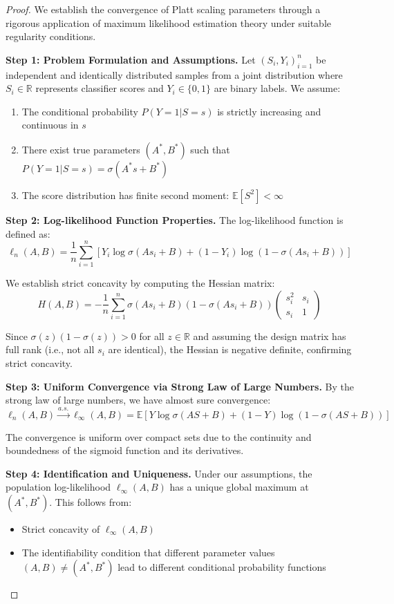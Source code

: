 \documentclass[12pt, a4paper]{article}
\begin{document}
\begin{proof}
We establish the convergence of Platt scaling parameters through a rigorous application of maximum likelihood estimation theory under suitable regularity conditions.

\textbf{Step 1: Problem Formulation and Assumptions.}
Let $(S_i, Y_i)_{i=1}^n$ be independent and identically distributed samples from a joint distribution where $S_i \in \mathbb{R}$ represents classifier scores and $Y_i \in \{0,1\}$ are binary labels. We assume:
\begin{enumerate}
    \item The conditional probability $P(Y=1|S=s)$ is strictly increasing and continuous in $s$
    \item There exist true parameters $(A^*, B^*)$ such that $P(Y=1|S=s) = \sigma(A^*s + B^*)$
    \item The score distribution has finite second moment: $\mathbb{E}[S^2] < \infty$
\end{enumerate}

\textbf{Step 2: Log-likelihood Function Properties.}
The log-likelihood function is defined as:
$$\ell_n(A,B) = \frac{1}{n}\sum_{i=1}^n \left[ Y_i \log \sigma(As_i + B) + (1-Y_i) \log(1 - \sigma(As_i + B)) \right]$$

We establish strict concavity by computing the Hessian matrix:
$$H(A,B) = -\frac{1}{n}\sum_{i=1}^n \sigma(As_i + B)(1-\sigma(As_i + B)) \begin{pmatrix} s_i^2 & s_i \\ s_i & 1 \end{pmatrix}$$

Since $\sigma(z)(1-\sigma(z)) > 0$ for all $z \in \mathbb{R}$ and assuming the design matrix has full rank (i.e., not all $s_i$ are identical), the Hessian is negative definite, confirming strict concavity.

\textbf{Step 3: Uniform Convergence via Strong Law of Large Numbers.}
By the strong law of large numbers, we have almost sure convergence:
$$\ell_n(A,B) \xrightarrow{a.s.} \ell_\infty(A,B) = \mathbb{E}\left[ Y \log \sigma(AS + B) + (1-Y) \log(1 - \sigma(AS + B)) \right]$$

The convergence is uniform over compact sets due to the continuity and boundedness of the sigmoid function and its derivatives.

\textbf{Step 4: Identification and Uniqueness.}
Under our assumptions, the population log-likelihood $\ell_\infty(A,B)$ has a unique global maximum at $(A^*, B^*)$. This follows from:
\begin{itemize}
    \item Strict concavity of $\ell_\infty(A,B)$
    \item The identifiability condition that different parameter values $(A,B) \neq (A^*, B^*)$ lead to different conditional probability functions
\end{itemize}


\end{proof}
\end{document}
